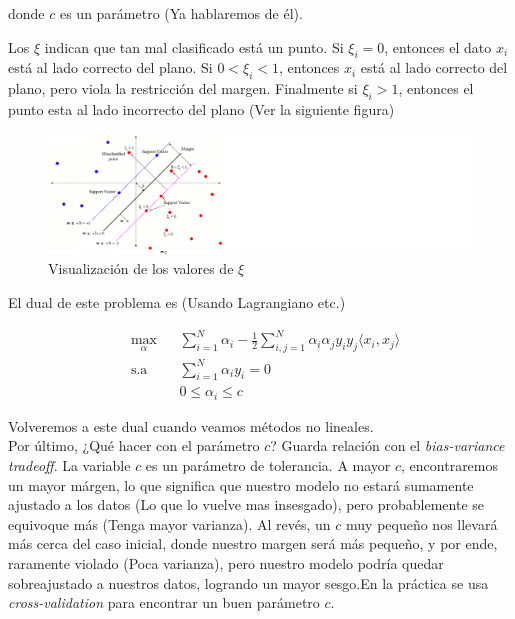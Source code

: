 donde $c$ es un parámetro (Ya hablaremos de él).

Los $\xi$ indican que tan mal clasificado está un punto. Si $\xi_i = 0$, entonces el dato $x_i$ está al lado correcto del plano. Si $0<\xi_i <1$, entonces $x_i$ está al lado correcto del plano, pero viola la restricción del margen. Finalmente si $\xi_i>1$, entonces el punto esta al lado incorrecto del plano (Ver la siguiente figura)

\begin{figure}[ht]
    \centering
    \includegraphics[scale=0.7]{img/softsvm}
    \caption{Visualización de los valores de $\xi$}
    \label{fig:my_label4}
\end{figure}

El dual de este problema es (Usando Lagrangiano etc.)

\begin{equation*}
\begin{aligned}
& \underset{\alpha}{\text{max}}
& & \sum\limits_{i=1}^{N}\alpha_i - \frac{1}{2} \sum\limits_{i,j=1}^{N} \alpha_i \alpha_j y_i y_j \langle x_i, x_j\rangle\\
& \text{s.a}
& & \sum\limits_{i=1}^{N} \alpha_i y_i= 0 \\
& &  &0 \leq \alpha_i \leq c
\end{aligned}
\end{equation*}

Volveremos a este dual cuando veamos métodos no lineales. 
\\

Por último, ¿Qué hacer con el parámetro $c$? Guarda relación con el \textit{bias-variance tradeoff}. La variable $c$ es un parámetro de tolerancia. A mayor $c$, encontraremos un mayor márgen, lo que significa que nuestro modelo no estará sumamente ajustado a los datos (Lo que lo vuelve mas insesgado), pero probablemente se equivoque más (Tenga mayor varianza). Al revés, un $c$ muy pequeño nos llevará más cerca del caso inicial, donde nuestro margen será más pequeño, y por ende, raramente violado (Poca varianza), pero nuestro modelo podría quedar sobreajustado a nuestros datos, logrando un mayor sesgo.En la práctica se usa \textit{cross-validation} para encontrar un buen parámetro $c$.  


